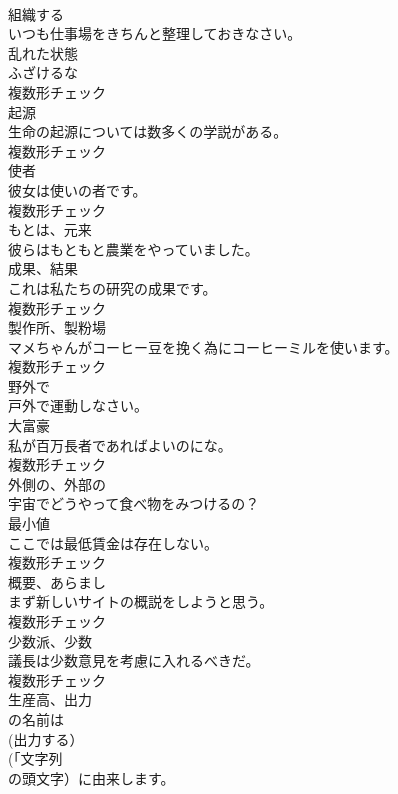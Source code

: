 \documentclass[8pt]{extreport}
\begin{document}
\begin{CJK}{UTF8}{min}
\\	[動詞]	組織する	
\\	いつも仕事場をきちんと整理しておきなさい。	
\\	[名詞]	乱れた状態	
\\	ふざけるな	
\\	複数形チェック
\\	[名詞]	起源	
\\	生命の起源については数多くの学説がある。	
\\	複数形チェック
\\	[名詞]	使者	
\\	彼女は使いの者です。	
\\	複数形チェック
\\	[副詞]	もとは、元来	
\\	彼らはもともと農業をやっていました。	
\\	[名詞]	成果、結果	
\\	これは私たちの研究の成果です。	
\\	複数形チェック
\\	[名詞]	製作所、製粉場	
\\	マメちゃんがコーヒー豆を挽く為にコーヒーミルを使います。	
\\	複数形チェック
\\	[副詞]	野外で	
\\	戸外で運動しなさい。	
\\	[名詞]	大富豪	
\\	私が百万長者であればよいのにな。	
\\	複数形チェック
\\	[形容詞]	外側の、外部の	
\\	宇宙でどうやって食べ物をみつけるの？	
\\	[名詞]	最小値	
\\	ここでは最低賃金は存在しない。	
\\	複数形チェック
\\	[名詞]	概要、あらまし	
\\	まず新しいサイトの概説をしようと思う。	
\\	複数形チェック
\\	[名詞]	少数派、少数	
\\	議長は少数意見を考慮に入れるべきだ。	
\\	複数形チェック
\\	[名詞]	生産高、出力	
\\	の名前は
\\	(出力する）
\\	(「文字列
\\	の頭文字）に由来します。	

\end{CJK}
\end{document}
